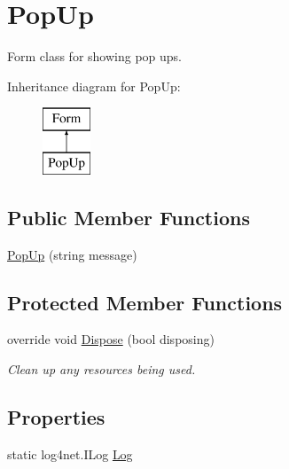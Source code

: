 \hypertarget{classWildlifeTrackingApp_1_1PopUp}{}\section{Pop\+Up}
\label{classWildlifeTrackingApp_1_1PopUp}


Form class for showing pop ups.  


Inheritance diagram for Pop\+Up\+:\begin{figure}[H]
\begin{center}
\leavevmode
\includegraphics[height=2.000000cm]{classWildlifeTrackingApp_1_1PopUp}
\end{center}
\end{figure}
\subsection*{Public Member Functions}
\begin{DoxyCompactItemize}
\item 
\hyperlink{classWildlifeTrackingApp_1_1PopUp_a67d49d569e4da9c09f0d9b54c3987275}{Pop\+Up} (string message)
\end{DoxyCompactItemize}
\subsection*{Protected Member Functions}
\begin{DoxyCompactItemize}
\item 
override void \hyperlink{classWildlifeTrackingApp_1_1PopUp_a849c3c7f8d08104f0cdb46bee9fe6389}{Dispose} (bool disposing)
\begin{DoxyCompactList}\small\item\em Clean up any resources being used. \end{DoxyCompactList}\end{DoxyCompactItemize}
\subsection*{Properties}
\begin{DoxyCompactItemize}
\item 
static log4net.\+I\+Log \hyperlink{classWildlifeTrackingApp_1_1PopUp_a5fc9abb86e6110ecd61d0a1a7d740a8a}{Log}
\end{DoxyCompactItemize}
